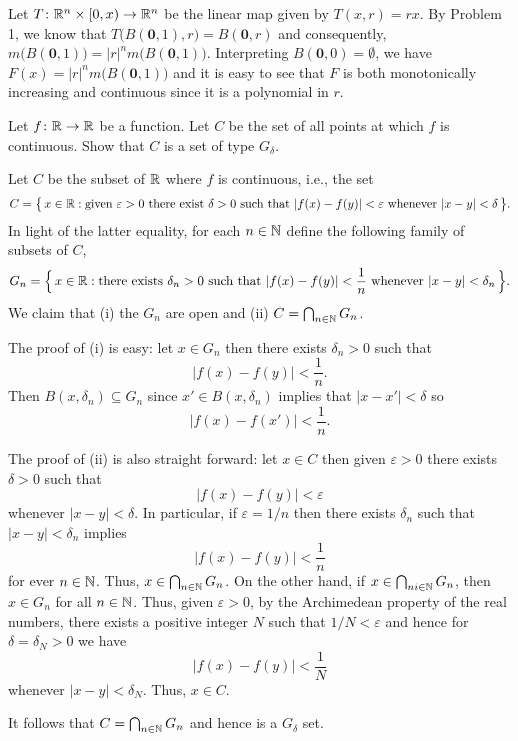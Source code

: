 \begin{solution}
  Let \(T\colon\mathbb{R}^n\times[0,x)\to\mathbb{R}^n\) be the linear map given by
  \(T(x,r)=rx\). By Problem 1, we know that
  \(T\bigl(B(\mathbf{0},1),r\bigr)=B(\mathbf{0},r)\) and consequently,
  \(m\bigl(B(\mathbf{0},1)\bigr)=|r|^nm\bigl(B(\mathbf{0},1)\bigr)\). Interpreting
  \(B(\mathbf{0},0)=\emptyset\), we have
  \(F(x)=|r|^nm\bigl(B(\mathbf{0},1)\bigr)\) and it is easy to see that
  \(F\) is both monotonically increasing and continuous since it is a
  polynomial in \(r\).
\end{solution}

\begin{problem}
  Let \(f\colon\mathbb{R}\to\mathbb{R}\) be a function. Let \(C\) be the set of all
  points at which \(f\) is continuous. Show that \(C\) is a set of type
  \(G_\delta\).
\end{problem}
\begin{solution}
  Let \(C\) be the subset of \(\mathbb{R}\) where \(f\) is continuous, i.e., the
  set
  \[
    C=\bigl\{\,x\in\mathbb{R}:\text{given \(\varepsilon>0\) there exist
        \(\delta>0\) such that \(|f(x)-f(y)|<\varepsilon\) whenever
      \(|x-y|<\delta\)}\,\bigr\}.
  \]
  In light of the latter equality, for each \(n\in\mathbb{N}\) define the
  following family of subsets of \(C\),
  \[
    G_n=\Bigl\{\,x\in\mathbb{R}:\text{there exists \(\delta_n>0\) such that
        \(|f(x)-f(y)|<\frac{1}{n}\) whenever \(|x-y|<\delta_n\)}\,\Bigr\}.
  \]
  We claim that (i) the \(G_n\) are open and (ii)
  \(C=\bigcap_{n\in\mathbb{N}}G_n\).

  The proof of (i) is easy: let \(x\in G_n\) then there exists
  \(\delta_n>0\) such that
  \[
    |f(x)-f(y)|<\frac{1}{n}.
  \]
  Then \(B(x,\delta_n)\subseteq G_n\) since \(x'\in B(x,\delta_n)\) implies
  that \(|x-x'|<\delta\) so
  \[
    |f(x)-f(x')|<\frac{1}{n}.
  \]

  The proof of (ii) is also straight forward: let \(x\in C\) then given
  \(\varepsilon>0\) there exists \(\delta>0\) such that
  \[
    |f(x)-f(y)|<\varepsilon
  \]
  whenever \(|x-y|<\delta\). In particular, if \(\varepsilon=1/n\) then
  there exists \(\delta_n\) such that \(|x-y|<\delta_n\) implies
  \[
    |f(x)-f(y)|<\frac{1}{n}
  \]
  for ever \(n\in\mathbb{N}\). Thus, \(x\in\bigcap_{n\in\mathbb{N}} G_n\). On the other
  hand, if \(x\in\bigcap_{ni\in\mathbb{N}} G_n\), then \(x\in G_n\) for all
  \(n\in\mathbb{N}\). Thus, given \(\varepsilon>0\), by the Archimedean property
  of the real numbers, there exists a positive integer \(N\) such that
  \(1/N<\varepsilon\) and hence for \(\delta=\delta_N>0\) we have
  \[
    |f(x)-f(y)|<\frac{1}{N}
  \]
  whenever \(|x-y|<\delta_N\). Thus, \(x\in C\).

  It follows that \(C=\bigcap_{n\in\mathbb{N}} G_n\) and hence is a \(G_\delta\)
  set.
\end{solution}

